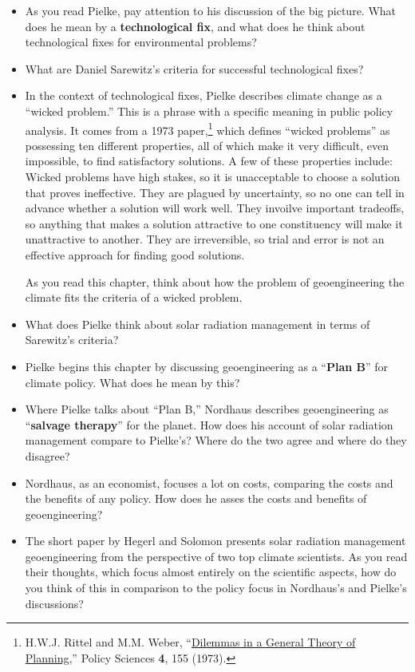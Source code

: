 \documentclass[
]{article}
\begin{document}
\begin{itemize}
\item
  As you read Pielke, pay attention to his discussion of the big
  picture. What does he mean by a \textbf{technological fix}, and what
  does he think about technological fixes for environmental problems?
\item
  What are Daniel Sarewitz's criteria for successful technological
  fixes?
\item
  In the context of technological fixes, Pielke describes climate change
  as a ``wicked problem.'' This is a phrase with a specific meaning in
  public policy analysis. It comes from a 1973 paper,\footnote{H.W.J.
    Rittel and M.M. Weber,
    ``\href{https://doi.org/10.1007/BF01405730}{Dilemmas in a General
    Theory of Planning},'' Policy Sciences \textbf{4}, 155 (1973).}
  which defines ``wicked problems'' as possessing ten different
  properties, all of which make it very difficult, even impossible, to
  find satisfactory solutions. A few of these properties include: Wicked
  problems have high stakes, so it is unacceptable to choose a solution
  that proves ineffective. They are plagued by uncertainty, so no one
  can tell in advance whether a solution will work well. They invoilve
  important tradeoffs, so anything that makes a solution attractive to
  one constituency will make it unattractive to another. They are
  irreversible, so trial and error is not an effective approach for
  finding good solutions.

  As you read this chapter, think about how the problem of
  geoengineering the climate fits the criteria of a wicked problem.
\item
  What does Pielke think about solar radiation management in terms of
  Sarewitz's criteria?
\item
  Pielke begins this chapter by discussing geoengineering as a
  ``\textbf{Plan B}'' for climate policy. What does he mean by this?
\item
  Where Pielke talks about ``Plan B,'' Nordhaus describes geoengineering
  as ``\textbf{salvage therapy}'' for the planet. How does his account
  of solar radiation management compare to Pielke's? Where do the two
  agree and where do they disagree?
\item
  Nordhaus, as an economist, focuses a lot on costs, comparing the costs
  and the benefits of any policy. How does he asses the costs and
  benefits of geoengineering?
\item
  The short paper by Hegerl and Solomon presents solar radiation
  management geoengineering from the perspective of two top climate
  scientists. As you read their thoughts, which focus almost entirely on
  the scientific aspects, how do you think of this in comparison to the
  policy focus in Nordhaus's and Pielke's discussions?
\end{itemize}
\end{document}
